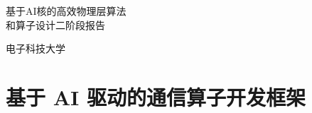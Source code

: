 \documentclass{CjC}
\begin{document}
    \raggedbottom %

    \makeatletter
    \newcommand{\mysmall}{\@setfontsize\mysmall{7}{9.5}}
    \newenvironment{tablehere}{\def\@captype{table}}{}
    \let\temp\footnote{\renewcommand{\footnote}[1]{\temp{\zihao{-5}#1}}}

    \thispagestyle{plain}%
    \thispagestyle{empty}%
    \pagestyle{CjCheadings}

    \vspace{-13mm}

    \begin{titlepage}
        \centering
        \vspace*{7cm} %
        {\Huge 基于AI核的高效物理层算法\\和算子设计二阶段报告 \par} %
        \vspace{1cm} %
        \vspace{5cm} %

        \vspace{1cm} %
        \vspace{1cm} %

        {\Large 电子科技大学 \par} %

        \vspace*{\fill} %
    \end{titlepage}

    \newpage

    \tableofcontents

    \newpage
    \setcounter{page}{1} %

    \section{基于 AI 驱动的通信算子开发框架}
    \label{sec:ai-framework}
\end{document}
